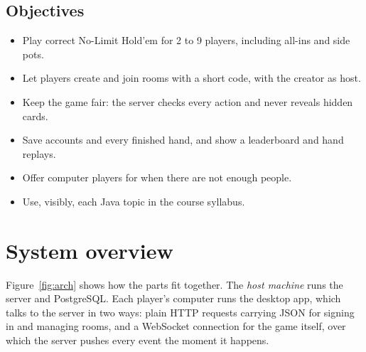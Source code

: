 \documentclass[12pt,a4paper]{article}
\begin{document}
\subsection{Objectives}
\begin{itemize}
\item Play correct No-Limit Hold'em for 2 to 9 players, including all-ins and side pots.
\item Let players create and join rooms with a short code, with the creator as host.
\item Keep the game fair: the server checks every action and never reveals hidden cards.
\item Save accounts and every finished hand, and show a leaderboard and hand replays.
\item Offer computer players for when there are not enough people.
\item Use, visibly, each Java topic in the course syllabus.
\end{itemize}

\section{System overview}

Figure~\ref{fig:arch} shows how the parts fit together. The \emph{host machine} runs the
server and PostgreSQL. Each player's computer runs the desktop app, which talks to the server
in two ways: plain HTTP requests carrying JSON for signing in and managing rooms, and a
WebSocket connection for the game itself, over which the server pushes every event the moment
it happens.
\end{document}
